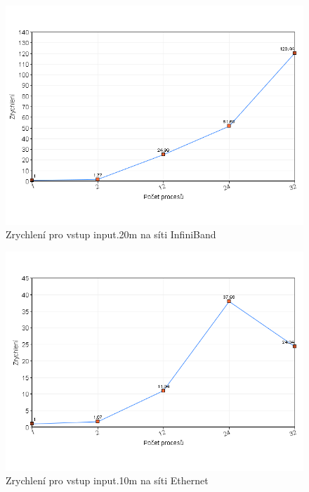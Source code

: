 \documentclass[12pt]{article}
\begin{document}
\begin{figure}[ht]
\begin{center}
\includegraphics[width=15cm]{input_20m_infiniband}
\end{center}
\caption{Zrychlení pro vstup input.20m na síti InfiniBand}
\end{figure}

\begin{figure}[ht]
\begin{center}
\includegraphics[width=15cm]{input_10m_ethernet}
\end{center}
\caption{Zrychlení pro vstup input.10m na síti Ethernet}
\end{figure}
\end{document}
